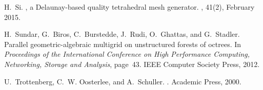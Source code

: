 \documentclass[]{siamart0216}
\begin{document}
\begin{thebibliography}{10}
H.~Si.
, a {Delaunay}-based quality tetrahedral mesh generator.
, 41(2),
  February 2015.

H.~Sundar, G.~Biros, C.~Burstedde, J.~Rudi, O.~Ghattas, and G.~Stadler.
\newblock Parallel geometric-algebraic multigrid on unstructured forests of
  octrees.
\newblock In {\em Proceedings of the International Conference on High
  Performance Computing, Networking, Storage and Analysis}, page~43. IEEE
  Computer Society Press, 2012.

U.~Trottenberg, C.~W. Oosterlee, and A.~Schuller.
.
\newblock Academic Press, 2000.

\end{thebibliography}
\end{document}
